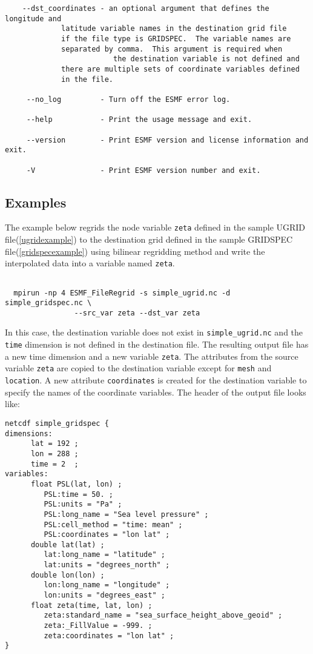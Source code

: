 \begin{verbatim}
    --dst_coordinates - an optional argument that defines the longitude and
			 latitude variable names in the destination grid file
			 if the file type is GRIDSPEC.  The variable names are
			 separated by comma.  This argument is required when
                         the destination variable is not defined and
			 there are multiple sets of coordinate variables defined
			 in the file.  

     --no_log         - Turn off the ESMF error log.

     --help           - Print the usage message and exit.

     --version        - Print ESMF version and license information and exit.

     -V               - Print ESMF version number and exit.
\end{verbatim}


\subsection{Examples}

The example below regrids the node variable {\tt zeta} defined in the sample UGRID file(\ref{ugridexample}) to 
the destination grid defined in the sample GRIDSPEC file(\ref{gridspecexample}) using bilinear regridding
method and write the interpolated data into a variable named {\tt zeta}.  

\begin{verbatim}

  mpirun -np 4 ESMF_FileRegrid -s simple_ugrid.nc -d simple_gridspec.nc \
                --src_var zeta --dst_var zeta

\end{verbatim}

In this case, the destination variable does not exist in {\tt simple\_ugrid.nc} and the {\tt time}
dimension is not defined in the destination file.  The resulting output file has a new time dimension and a new variable {\tt zeta}.
The attributes from the source variable {\tt zeta} are copied to the destination variable except for 
{\tt mesh} and {\tt location}.  A new attribute {\tt coordinates} is created for the destination variable to
specify the names of the coordinate variables.  The header of the output file looks like:

\begin{verbatim}
netcdf simple_gridspec {
dimensions:
      lat = 192 ;
      lon = 288 ;
      time = 2  ;
variables:
      float PSL(lat, lon) ;
         PSL:time = 50. ;
         PSL:units = "Pa" ;
         PSL:long_name = "Sea level pressure" ;
         PSL:cell_method = "time: mean" ;
         PSL:coordinates = "lon lat" ;
      double lat(lat) ;
         lat:long_name = "latitude" ;
         lat:units = "degrees_north" ;
      double lon(lon) ;
         lon:long_name = "longitude" ;
         lon:units = "degrees_east" ;
      float zeta(time, lat, lon) ;
         zeta:standard_name = "sea_surface_height_above_geoid" ;
         zeta:_FillValue = -999. ;
         zeta:coordinates = "lon lat" ;
}
\end{verbatim}
  
